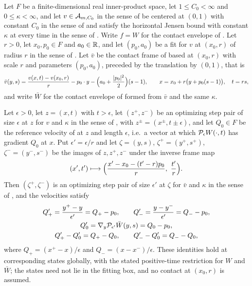 \begin{lemma}
Let $F$ be a finite-dimensional real inner-product space, let
$1\le C_0<\infty$ and $0\le\kappa<\infty$, and let $v\in\mathcal{A}_{m,C_0}$ in the
sense of  be centered at $(0,1)$ with constant $C_0$ in the
sense of  and satisfy the horizontal Jensen bound with
constant $\kappa$ at every time in the sense of . Write
$f=W$ for the contact envelope of . Let $r>0$, let
$x_0,p_0\in F$ and $a_0\in\mathbb{R}$, and let $(p_0,a_0)$ be a fit for $v$ at
$(x_0,r)$ of radius $r$ in the sense of . Let $\bar v$ be the
contact frame of  based at $(x_0,r)$ with scale $r$ and
parameters $(p_0,a_0)$, preceded by the translation by $(0,1)$, that is
\[
  \bar v(y,s)=\frac{v(x,t)-v(x_0,r)}{r}
          -p_0\cdot y-\Bigl(a_0+\frac{|p_0|^2}{2}\Bigr)(s-1),
  \qquad x=x_0+r\bigl(y+p_0(s-1)\bigr),\quad t=rs,
\]
and write $\bar W$ for the contact envelope of  formed from
$\bar v$ and the same $\kappa$.

Let $\epsilon>0$, let $z=(x,t)$ with $t>\epsilon$, let $(z^+,z^-)$ be an
optimizing step pair of size $\epsilon$ at $z$ for $v$ and $\kappa$ in the sense
of , with $z^\pm=(x^\pm,t\pm\epsilon)$, and let $Q_0\in F$
be the reference velocity of  at $z$ and length
$\epsilon$, i.e.\ a vector at which $\mathcal{P}_\epsilon W(\cdot,t)$ has gradient
$Q_0$ at $x$. Put $\epsilon'=\epsilon/r$ and let
$\zeta=(y,s)$, $\zeta^+=(y^+,s^+)$, $\zeta^-=(y^-,s^-)$ be the images of
$z,z^+,z^-$ under the inverse frame map
\[
  (x',t')\longmapsto
    \Bigl(\frac{x'-x_0-(t'-r)p_0}{r},\ \frac{t'}{r}\Bigr).
\]
Then $(\zeta^+,\zeta^-)$ is an optimizing step pair of size $\epsilon'$ at
$\zeta$ for $\bar v$ and $\kappa$ in the sense of , and the
velocities satisfy
\begin{equation}\label{eq:contact-velocity-covariance}
\begin{gathered}
  Q'_+=\frac{y^+-y}{\epsilon'}=Q_+-p_0,\qquad
  Q'_-=\frac{y-y^-}{\epsilon'}=Q_--p_0,\\
  Q'_0=\nabla_y\mathcal{P}_{\epsilon'}\bar W(y,s)=Q_0-p_0,\\
  Q'_+-Q'_0=Q_+-Q_0,\qquad Q'_--Q'_0=Q_--Q_0,
\end{gathered}
\end{equation}
where $Q_+=(x^+-x)/\epsilon$ and $Q_-=(x-x^-)/\epsilon$. These identities hold
at corresponding states globally, with the stated positive-time restriction for
$W$ and $\bar W$; the states need not lie in the fitting box, and no contact at
$(x_0,r)$ is assumed.
\end{lemma}
